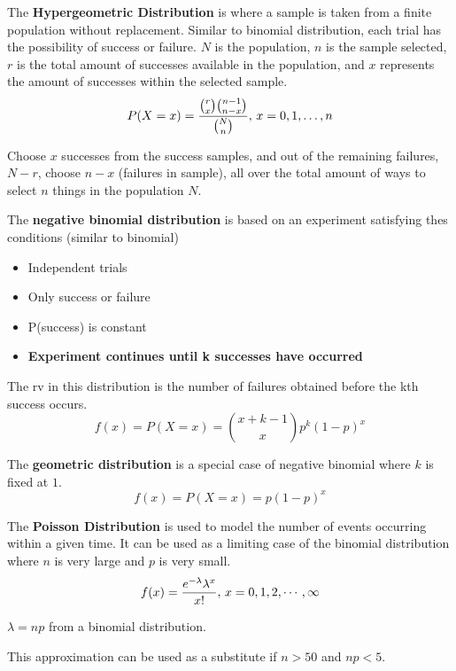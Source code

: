 \documentclass[english, 12pt]{article}
\begin{document}
\begin{defn}
The \textbf{Hypergeometric Distribution} is where a sample is taken from a finite population without replacement. Similar to binomial distribution, each trial has the possibility of success or failure. $N$ is the population, $n$ is the sample selected, $r$ is the total amount of successes available in the population, and $x$ represents the amount of successes within the selected sample.
\[P(X=x) = \frac{{r\choose x} {n-1 \choose n - x}}{{N \choose n}},\,x = 0,1,\dots,n\]
\begin{qte}
Choose $x$ successes from the success samples, and out of the remaining failures, $N-r$, choose $n-x$ (failures in sample), all over the total amount of ways to select $n$ things in the population $N$.
\end{qte}
\end{defn}

\begin{defn}
The \textbf{negative binomial distribution} is based on an experiment satisfying thes conditions (similar to binomial)
\begin{itemize}
\item Independent trials
\item Only success or failure
\item P(success) is constant
\item \textbf{Experiment continues until k successes have occurred}
\end{itemize}
The rv in this distribution is the number of failures obtained before the kth success occurs.
\[ f(x) = P(X =x) = {x + k - 1 \choose x} p^k (1-p)^x\]
\end{defn}

\begin{defn}
The \textbf{geometric distribution} is a special case of negative binomial where $k$ is fixed at $1$.
\[f(x) = P(X=x) = p(1-p)^x\]
\end{defn}

\begin{defn}
The \textbf{Poisson Distribution} is used to model the number of events occurring within a given time. It can be used as a limiting case of the binomial distribution where $n$ is very large and $p$ is very small.
\[f(x) = \frac{e^{-\lambda} \lambda^x}{x!},\, x = 0,1,2,\cdots,\infty\]
\begin{note}
$\lambda = np$ from a binomial distribution.
\end{note}
\begin{qte}
This approximation can be used as a substitute if $n > 50$ and $np < 5$.
\end{qte}
\end{defn}
\end{document}
